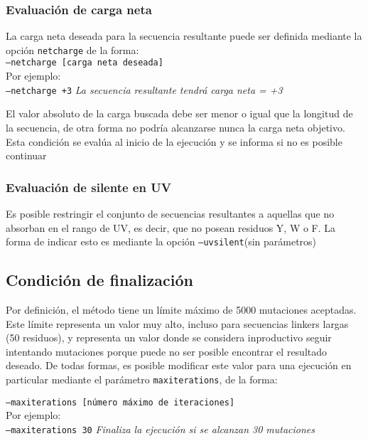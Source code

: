 \subsubsection{Evaluación de carga neta}

La carga neta deseada para la secuencia resultante puede ser definida mediante la opción \texttt{netcharge} de la forma: \\
\indent \texttt{--netcharge [carga neta deseada]} 
\\Por ejemplo: \\
\indent \texttt{--netcharge +3} \hspace{0.5cm} \textit{La secuencia resultante tendrá carga neta = +3}

El valor absoluto de la carga buscada debe ser menor o igual que la longitud de la secuencia, de otra forma no podría alcanzarse nunca la carga neta objetivo.
Esta condición se evalúa al inicio de la ejecución y se informa si no es posible continuar


\subsubsection{Evaluación de silente en UV}\label{uvsilent}

Es posible restringir el conjunto de secuencias resultantes a aquellas que no absorban en el rango de UV, es decir, que no posean residuos Y, W o F.
La forma de indicar esto es mediante la opción \texttt{--uvsilent}(sin parámetros)



\subsection{Condición de finalización} \label{condicionFin}

Por definición, el método tiene un límite máximo de 5000 mutaciones aceptadas.
Este límite representa un valor muy alto, incluso para secuencias linkers largas (50 residuos), y representa un valor donde se considera inproductivo seguir intentando mutaciones porque puede no ser posible encontrar el resultado deseado. 
De todas formas, es posible modificar este valor para una ejecución en particular mediante el parámetro \texttt{maxiterations}, de la forma:

\indent \texttt{--maxiterations [número máximo de iteraciones]} 
\\Por ejemplo: \\
\indent \texttt{--maxiterations 30} \hspace{0.5cm} \textit{Finaliza la ejecución si se alcanzan 30 mutaciones}


